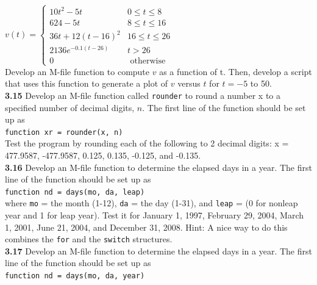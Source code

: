 \documentclass[../main.tex]{subfiles}
\begin{document}
\begin{multicols}{2}
    $v(t)=\left\{\begin{array}{cc}
        10 t^{2}-5 t & 0 \leq t \leq 8 \\
        624-5 t & 8 \leq t \leq 16 \\
        36 t+12(t-16)^{2} & 16 \leq t \leq 26 \\
        2136 e^{-0.1(t-26)} & t>26 \\
        0 & \text { otherwise }
        \end{array}\right.$\\

    \noindent Develop an M-file function to compute $v$ as a function of t.
    Then, develop a script that uses this function to generate a
    plot of $v$ versus $t$ for $t=-5$ to 50.\\

    \noindent\textbf{3.15} Develop an M-file function called \texttt{rounder} to round a
    number x to a specified number of decimal digits, $n$. The first
    line of the function should be set up as\\

    \texttt{function xr = rounder(x, n)}\\

    \noindent Test the program by rounding each of the following to 2 decimal
    digits: x = 477.9587, -477.9587, 0.125, 0.135, -0.125,
    and -0.135.\\

    \noindent\textbf{3.16} Develop an M-file function to determine the elapsed
    days in a year. The first line of the function should be set
    up as\\

    \texttt{function nd = days(mo, da, leap)}\\

    \noindent where \texttt{mo} = the month (1-12), \texttt{da} = the day (1-31), and
    \texttt{leap} = (0 for nonleap year and 1 for leap year). Test it for
    January 1, 1997, February 29, 2004, March 1, 2001, June 21,
    2004, and December 31, 2008. Hint: A nice way to do this
    combines the \texttt{for} and the \texttt{switch} structures.\\

    \noindent\textbf{3.17} Develop an M-file function to determine the elapsed
    days in a year. The first line of the function should be set up as\\

    \texttt{function nd = days(mo, da, year)}\\


\end{multicols}
\end{document}
